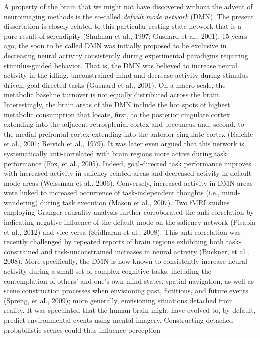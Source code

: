 \documentclass[authoryear,review,3p]{elsarticle}
\begin{document}
A property of the brain that we might not have
discovered without the advent of neuroimaging methods is the
so-called \textit{default mode network} (DMN).
The present dissertation is closely related
to this particular resting-state network
that is a pure result of serendipity
(Shulman et al., 1997; Gusnard et al., 2001).
%
15 years ago,
the soon to be called DMN was initially proposed to be exclusive
in decreasing neural activity consistently during experimental
paradigms requiring stimulus-guided behavior.
That is, the DMN was believed to
increase neural activity in the idling, unconstrained mind and decrease activity
during stimulus-driven, goal-directed tasks (Gusnard et al., 2001).
On a macro-scale, the metabolic baseline turnover is not equally
distributed across the brain.
Interestingly, the brain areas of the DMN include the hot spots of
highest metabolic consumption that locate, first, to the
posterior cingulate cortex extending into the adjacent retrosplenial
cortex and precuneus and, second, to the medial prefrontal cortex
extending into the anterior cingulate cortex
(Raichle et al., 2001; Reivich et al., 1979).
It was later even argued that this network is systematically anti-correlated
with brain regions more active during task performance (Fox, et al., 2005).
Indeed, goal-directed task performance improves with increased activity
in saliency-related areas and decreased activity in default-mode
areas (Weissman et al., 2006). Conversely, increased activity in DMN areas
were linked to increased occurrence of
task-independent thoughts (i.e., mind-wandering) during task
execution (Mason et al., 2007). Two fMRI studies employing Granger causality
analysis further corroborated the anti-correlation by indicating negative
influence of the default-mode on the saliency
network (Pisapia et al., 2012) and vice versa (Sridharan et al., 2008).
This anti-correlation was recently challenged by repeated reports of brain regions
exhibiting both task-constrained and task-unconstrained increases in
neural activity (Buckner, et al., 2008). More specifically,
the DMN is now known to consistently increase neural activity
during a small set of complex cognitive tasks, including
the contemplation of others’ and one’s own mind states,
spatial navigation,
as well as scene construction processes
when envisioning past, fictitious, and future events
(Spreng, et al., 2009);
more generally, envisioning situations detached from reality.
%
It was speculated that the human brain might have evolved to,
by default, predict environmental events using mental imagery.
Constructing detached probabilistic scenes could thus influence perception
\end{document}
